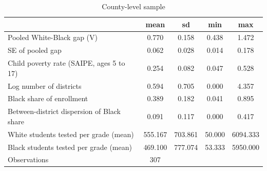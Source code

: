 \begin{table}[htbp]\centering
\def\sym#1{\ifmmode^{#1}\else\(^{#1}\)\fi}
\caption{County-level sample}
\begin{tabular}{l*{1}{cccc}}
\toprule
                    &        mean&          sd&         min&         max\\
\midrule
Pooled White-Black gap (V)&       0.770&       0.158&       0.438&       1.472\\
SE of pooled gap    &       0.062&       0.028&       0.014&       0.178\\
Child poverty rate (SAIPE, ages 5 to 17)&       0.254&       0.082&       0.047&       0.528\\
Log number of districts&       0.594&       0.705&       0.000&       4.357\\
Black share of enrollment&       0.389&       0.182&       0.041&       0.895\\
Between-district dispersion of Black share&       0.091&       0.117&       0.000&       0.417\\
White students tested per grade (mean)&     555.167&     703.861&      50.000&    6094.333\\
Black students tested per grade (mean)&     469.100&     777.074&      53.333&    5950.000\\
\midrule
Observations        &         307&            &            &            \\
\bottomrule
\end{tabular}
\end{table}
